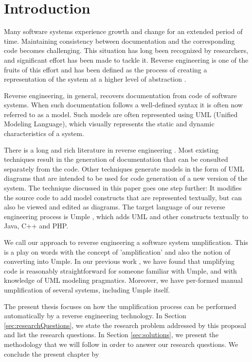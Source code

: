 \chapter{Introduction}

Many software systems experience growth and change for an extended period of time. Maintaining consistency between documentation and the corresponding code becomes challenging. This situation has long been recognized by researchers, and significant effort has been made to tackle it. Reverse engineering is one of the fruits of this effort and has been defined as the process of creating a representation of the system at a higher level of abstraction \cite{Chikofsky}.

Reverse engineering, in general, recovers documentation from code of software systems. When such documentation follows a well-defined syntax it is often now referred to as a model.  Such models are often represented using UML (Unified Modeling Language), which visually represents the static and dynamic characteristics of a system. 

There is a long and rich literature in reverse engineering \cite{CanforaHarman2007}. Most existing techniques result in the generation of documentation that can be consulted separately from the code. Other techniques generate models in the form of UML diagrams that are intended to be used for code generation of a new version of the system. The technique discussed in this paper goes one step further: It modifies the source code to add model constructs that are represented textually, but can also be viewed and edited as diagrams. The target language of our reverse engineering process is Umple \cite{Badreddin2010}, which adds UML and other constructs textually to Java, C++ and PHP.

We call our approach to reverse engineering a software system umplification. This is a play on words with the concept of 'amplification' and also the notion of converting into Umple. In our previous work \cite{Lethbridge2010c}, we have found that umplifying code is reasonably straightforward for someone familiar with Umple, and with knowledge of UML modeling pragmatics. Moreover, we have per-formed manual umplification of several systems, including Umple itself. 

The present thesis focuses on how the umplification process can be performed automatically by a reverse engineering technology. In Section \ref{sec:researchQuestions}, we state the research problem addressed by this proposal and list the research questions. In Section \ref{sec:solutions}, we present the methodology that we will follow in order to answer our research questions. We conclude the present chapter by

